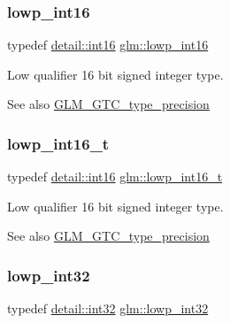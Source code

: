 \subsubsection{\texorpdfstring{lowp\+\_\+int16}{lowp\_int16}}
{\footnotesize\ttfamily typedef \hyperlink{namespaceglm_1_1detail_a375938874ca4f0a0982ec6373b56117b}{detail\+::int16} \hyperlink{group__gtc__type__precision_ga71fc0c399fa4780507748b643733f153}{glm\+::lowp\+\_\+int16}}

Low qualifier 16 bit signed integer type. \begin{DoxySeeAlso}{See also}
\hyperlink{group__gtc__type__precision}{G\+L\+M\+\_\+\+G\+T\+C\+\_\+type\+\_\+precision} 
\end{DoxySeeAlso}
\mbox{\label{group__gtc__type__precision_gae34c3d53c4c1434fc9f26538b0185667}} 
\subsubsection{\texorpdfstring{lowp\+\_\+int16\+\_\+t}{lowp\_int16\_t}}
{\footnotesize\ttfamily typedef \hyperlink{namespaceglm_1_1detail_a375938874ca4f0a0982ec6373b56117b}{detail\+::int16} \hyperlink{group__gtc__type__precision_gae34c3d53c4c1434fc9f26538b0185667}{glm\+::lowp\+\_\+int16\+\_\+t}}

Low qualifier 16 bit signed integer type. \begin{DoxySeeAlso}{See also}
\hyperlink{group__gtc__type__precision}{G\+L\+M\+\_\+\+G\+T\+C\+\_\+type\+\_\+precision} 
\end{DoxySeeAlso}
\mbox{\label{group__gtc__type__precision_gad9939c9d6fec1c6accc02a83c6500f08}} 
\subsubsection{\texorpdfstring{lowp\+\_\+int32}{lowp\_int32}}
{\footnotesize\ttfamily typedef \hyperlink{namespaceglm_1_1detail_a9f85b4efeca416cdcec2fd08939a2e17}{detail\+::int32} \hyperlink{group__gtc__type__precision_gad9939c9d6fec1c6accc02a83c6500f08}{glm\+::lowp\+\_\+int32}}

